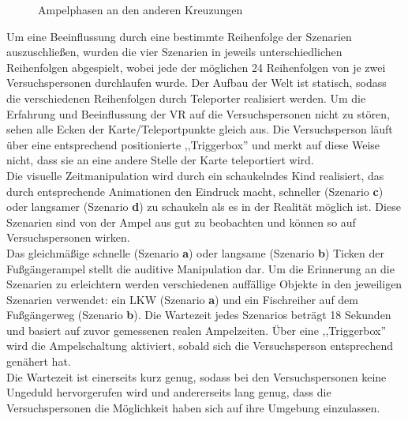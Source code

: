 \documentclass{Paper}
\begin{document}
\begin{figure}[H]
	\caption{Ampelphasen an den anderen Kreuzungen}
	\label{img:ampelphasen-2}
\end{figure}


Um eine Beeinflussung durch eine bestimmte Reihenfolge der Szenarien auszuschließen, wurden die vier Szenarien in jeweils unterschiedlichen Reihenfolgen abgespielt, wobei jede der möglichen 24 Reihenfolgen von je zwei Versuchspersonen durchlaufen wurde.
Der Aufbau der Welt ist statisch, sodass die verschiedenen Reihenfolgen durch Teleporter realisiert werden. Um die Erfahrung und Beeinflussung der VR auf die Versuchspersonen nicht zu stören, sehen alle Ecken der Karte/Teleportpunkte gleich aus. Die Versuchsperson läuft über eine entsprechend positionierte ,,Triggerbox'' und merkt auf diese Weise nicht, dass sie an eine andere Stelle der Karte teleportiert wird.\\
Die visuelle Zeitmanipulation wird durch ein schaukelndes Kind realisiert, das durch entsprechende Animationen den Eindruck macht, schneller (Szenario \textbf{c}) oder langsamer (Szenario \textbf{d}) zu schaukeln als es in der Realität möglich ist. Diese Szenarien sind von der Ampel aus gut zu beobachten und können so auf Versuchspersonen wirken.\\
Das gleichmäßige schnelle (Szenario \textbf{a}) oder langsame (Szenario \textbf{b}) Ticken der Fußgängerampel stellt die auditive Manipulation dar. Um die Erinnerung an die Szenarien zu erleichtern werden verschiedenen auffällige Objekte in den jeweiligen Szenarien verwendet: ein LKW (Szenario \textbf{a}) und ein Fischreiher auf dem Fußgängerweg (Szenario \textbf{b}).
Die Wartezeit jedes Szenarios beträgt 18 Sekunden und basiert auf zuvor gemessenen realen Ampelzeiten. Über eine ,,Triggerbox'' wird die Ampelschaltung aktiviert, sobald sich die Versuchsperson entsprechend genähert hat. \\
Die Wartezeit ist einerseits kurz genug, sodass bei den Versuchspersonen keine Ungeduld hervorgerufen wird und andererseits lang genug, dass die Versuchspersonen die Möglichkeit haben sich auf ihre Umgebung einzulassen. 
\end{document}
